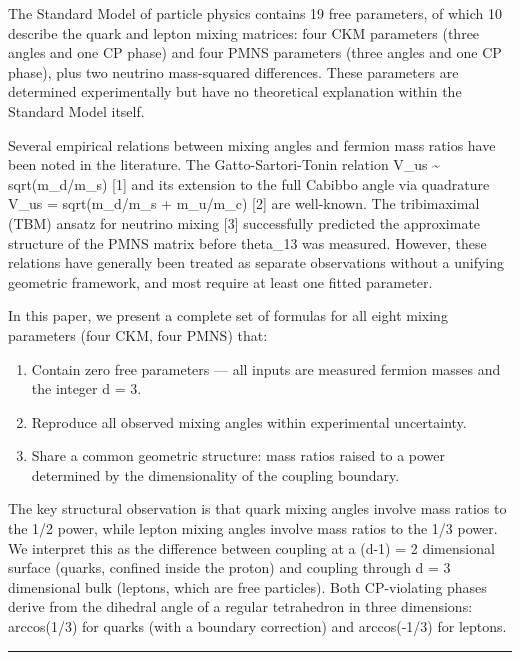 \documentclass[
]{article}
\providecommand{\tightlist}{%
  \setlength{\itemsep}{0pt}\setlength{\parskip}{0pt}}
\begin{document}
The Standard Model of particle physics contains 19 free parameters, of
which 10 describe the quark and lepton mixing matrices: four CKM
parameters (three angles and one CP phase) and four PMNS parameters
(three angles and one CP phase), plus two neutrino mass-squared
differences. These parameters are determined experimentally but have no
theoretical explanation within the Standard Model itself.

Several empirical relations between mixing angles and fermion mass
ratios have been noted in the literature. The Gatto-Sartori-Tonin
relation V\_us \textasciitilde{} sqrt(m\_d/m\_s) {[}1{]} and its
extension to the full Cabibbo angle via quadrature V\_us =
sqrt(m\_d/m\_s + m\_u/m\_c) {[}2{]} are well-known. The tribimaximal
(TBM) ansatz for neutrino mixing {[}3{]} successfully predicted the
approximate structure of the PMNS matrix before theta\_13 was measured.
However, these relations have generally been treated as separate
observations without a unifying geometric framework, and most require at
least one fitted parameter.

In this paper, we present a complete set of formulas for all eight
mixing parameters (four CKM, four PMNS) that:

\begin{enumerate}
\def\labelenumi{\arabic{enumi}.}
\tightlist
\item
  Contain zero free parameters --- all inputs are measured fermion
  masses and the integer d = 3.
\item
  Reproduce all observed mixing angles within experimental uncertainty.
\item
  Share a common geometric structure: mass ratios raised to a power
  determined by the dimensionality of the coupling boundary.
\end{enumerate}

The key structural observation is that quark mixing angles involve mass
ratios to the 1/2 power, while lepton mixing angles involve mass ratios
to the 1/3 power. We interpret this as the difference between coupling
at a (d-1) = 2 dimensional surface (quarks, confined inside the proton)
and coupling through d = 3 dimensional bulk (leptons, which are free
particles). Both CP-violating phases derive from the dihedral angle of a
regular tetrahedron in three dimensions: arccos(1/3) for quarks (with a
boundary correction) and arccos(-1/3) for leptons.

\begin{center}\rule{0.5\linewidth}{0.5pt}\end{center}
\end{document}
